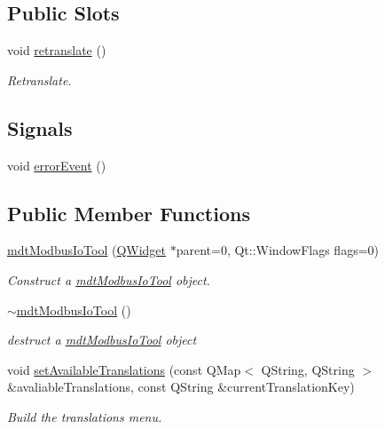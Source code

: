 \subsection*{Public Slots}
\begin{DoxyCompactItemize}
\item 
void \hyperlink{classmdt_modbus_io_tool_a5e0ccfb8e352242fffc3f65f442f4d2f}{retranslate} ()
\begin{DoxyCompactList}\small\item\em Retranslate. \end{DoxyCompactList}\end{DoxyCompactItemize}
\subsection*{Signals}
\begin{DoxyCompactItemize}
\item 
void \hyperlink{classmdt_modbus_io_tool_a530eb4396b483076be021689b4fc4a9c}{error\-Event} ()
\end{DoxyCompactItemize}
\subsection*{Public Member Functions}
\begin{DoxyCompactItemize}
\item 
\hyperlink{classmdt_modbus_io_tool_a8ce66aaa36a5e1f5569eaf00f01f28c6}{mdt\-Modbus\-Io\-Tool} (\hyperlink{class_q_widget}{Q\-Widget} $\ast$parent=0, Qt\-::\-Window\-Flags flags=0)
\begin{DoxyCompactList}\small\item\em Construct a \hyperlink{classmdt_modbus_io_tool}{mdt\-Modbus\-Io\-Tool} object. \end{DoxyCompactList}\item 
\hyperlink{classmdt_modbus_io_tool_a4321c2d67a52e135dba99a053ef26547}{$\sim$mdt\-Modbus\-Io\-Tool} ()
\begin{DoxyCompactList}\small\item\em destruct a \hyperlink{classmdt_modbus_io_tool}{mdt\-Modbus\-Io\-Tool} object \end{DoxyCompactList}\item 
void \hyperlink{classmdt_modbus_io_tool_a5609881a00e48c8cbd0047c3c6a15ff5}{set\-Available\-Translations} (const Q\-Map$<$ Q\-String, Q\-String $>$ \&avaliable\-Translations, const Q\-String \&current\-Translation\-Key)
\begin{DoxyCompactList}\small\item\em Build the translations menu. \end{DoxyCompactList}\end{DoxyCompactItemize}
